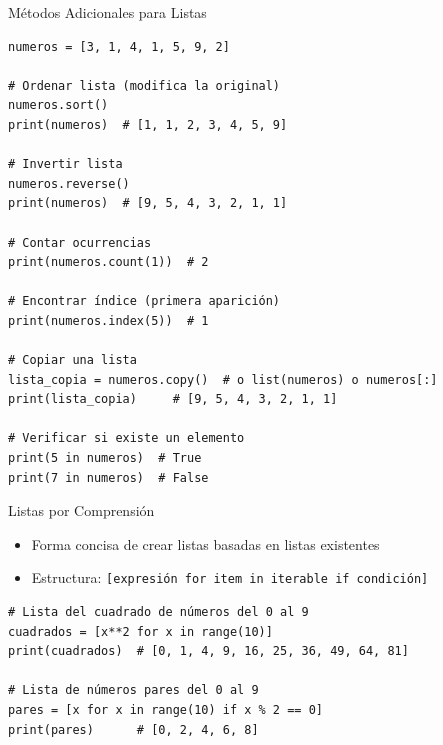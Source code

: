 \documentclass[10pt]{beamer}
\begin{document}
\begin{frame}[fragile]{Métodos Adicionales para Listas}
\begin{verbatim}
numeros = [3, 1, 4, 1, 5, 9, 2]

# Ordenar lista (modifica la original)
numeros.sort()
print(numeros)  # [1, 1, 2, 3, 4, 5, 9]

# Invertir lista
numeros.reverse()
print(numeros)  # [9, 5, 4, 3, 2, 1, 1]

# Contar ocurrencias
print(numeros.count(1))  # 2

# Encontrar índice (primera aparición)
print(numeros.index(5))  # 1

# Copiar una lista
lista_copia = numeros.copy()  # o list(numeros) o numeros[:]
print(lista_copia)     # [9, 5, 4, 3, 2, 1, 1]

# Verificar si existe un elemento
print(5 in numeros)  # True
print(7 in numeros)  # False
\end{verbatim}
\end{frame}

\begin{frame}[fragile]{Listas por Comprensión}
  \begin{itemize}
    \item Forma concisa de crear listas basadas en listas existentes
    \item Estructura: \texttt{[expresión for item in iterable if condición]}
  \end{itemize}
\begin{verbatim}
# Lista del cuadrado de números del 0 al 9
cuadrados = [x**2 for x in range(10)]
print(cuadrados)  # [0, 1, 4, 9, 16, 25, 36, 49, 64, 81]

# Lista de números pares del 0 al 9
pares = [x for x in range(10) if x % 2 == 0]
print(pares)      # [0, 2, 4, 6, 8]

\end{verbatim}
\end{frame}
\end{document}
